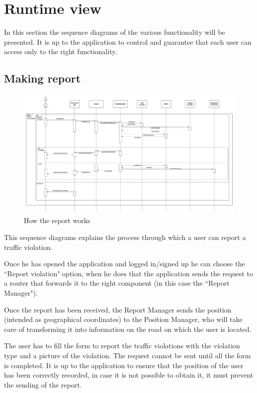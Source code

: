 \documentclass[12pt,a4paper]{report}
\begin{document}
		\section{Runtime view}
			In this section the sequence diagrams of the various functionality will be presented. It is up to the application to control and guarantee that each user can access only to the right functionality.
			\subsection{Making report}
				\begin{figure}[H]
						\includegraphics[width = 1.5\textwidth, center]{Report}
						\caption{How the report works}
						\label{fig: diagrams}
				\end{figure}
				This sequence diagrams explains the process through which a user can report a traffic violation.


				Once he has opened the application and logged in/signed up he can choose the ``Report violation" option,
				when he does that the application sends the request to a router that forwards it to the right
				component (in this case the ``Report Manager").


				Once the report has been received, the Report Manager sends the position (intended as geographical
				coordinates) to the Position Manager, who will take care of transforming it into information on the road on
				which the user is located.


				The user has to fill the form to report the traffic violations with the violation type and a picture of the
				violation. The request cannot be sent until all the form is completed. It is up to the
				application to ensure that the position of the user has been correctly recorded, in case it is not possible to
				obtain it, it must prevent the sending of the report. 
\end{document}
